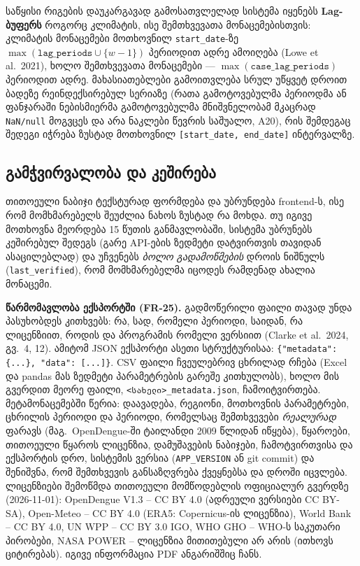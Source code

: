 \documentclass[11pt,a4paper]{article}
\begin{document}
საწყისი რიგების დაუკარგავად გამოსათვლელად სისტემა იყენებს \textbf{Lag-ბუფერს} როგორც კლიმატის, ისე შემთხვევათა მონაცემებისთვის:
კლიმატის მონაცემები მოთხოვნილ \texttt{start\_date}-ზე $\max(\texttt{lag\_periods} \cup \{w-1\})$ პერიოდით ადრე ამოიღება (Lowe et al.\ 2021),
ხოლო შემთხვევათა მონაცემები --- $\max(\texttt{case\_lag\_periods})$ პერიოდით ადრე.
მახასიათებლები გამოითვლება სრულ უწყვეტ დროით ბადეზე რეინდექსირებულ სერიაზე (რათა გამოტოვებულმა პერიოდმა ან ფანჯარაში ნებისმიერმა გამოტოვებულმა მნიშვნელობამ მკაცრად \texttt{NaN/null} მოგვცეს და არა ნაკლები წევრის საშუალო, A20),
რის შემდეგაც შედეგი იჭრება ზუსტად მოთხოვნილ \texttt{[start\_date, end\_date]} ინტერვალზე.

\subsection{გამჭვირვალობა და კეშირება}
თითოეული ნაბიჯი ტექსტურად ფორმდება და უბრუნდება frontend-ს, ისე რომ
მომხმარებელს შეუძლია ნახოს ზუსტად რა მოხდა. თუ იგივე მოთხოვნა მეორდება
15 წუთის განმავლობაში, სისტემა უბრუნებს კეშირებულ შედეგს (გარე API-ების
ზედმეტი დატვირთვის თავიდან ასაცილებლად) და უჩვენებს \emph{ბოლო
გადამოწმების} დროის ნიშნულს (\texttt{last\_verified}), რომ მომხმარებელმა
იცოდეს რამდენად ახალია მონაცემი.

\textbf{წარმომავლობა ექსპორტში (FR-25).} გადმოწერილი ფაილი თავად უნდა
პასუხობდეს კითხვებს: რა, სად, რომელი პერიოდი, საიდან, რა ლიცენზიით,
როდის და პროგრამის რომელი ვერსიით (Clarke et al.\ 2024, გვ.~4, 12).
ამიტომ JSON ექსპორტი ასეთი სტრუქტურისაა: \texttt{\{"metadata": \{...\}, "data": [...]\}}.
CSV ფაილი ჩვეულებრივ ცხრილად რჩება (Excel და pandas მას ზედმეტი
პარამეტრების გარეშე კითხულობს), ხოლო მის გვერდით მეორე ფაილი,
\texttt{<სახელი>\_metadata.json}, ჩამოიტვირთება. მეტამონაცემებში წერია: დაავადება,
რეგიონი, მოთხოვნის პარამეტრები, ცხრილის პერიოდი და პერიოდი, რომელსაც
შემთხვევები \emph{რეალურად} ფარავს (მაგ.\ OpenDengue-ში ტაილანდი 2009 წლიდან იწყება),
წყაროები, თითოეული წყაროს ლიცენზია, დამუშავების ნაბიჯები, ჩამოტვირთვისა
და ექსპორტის დრო, სისტემის ვერსია (\texttt{APP\_VERSION} ან git commit) და
შენიშვნა, რომ შემთხვევის განსაზღვრება ქვეყნებსა და დროში იცვლება.
ლიცენზიები შემოწმდა თითოეული მომწოდებლის ოფიციალურ გვერდზე (2026-11-01):
OpenDengue V1.3 -- CC BY 4.0 (ადრეული ვერსიები CC BY-SA), Open-Meteo -- CC BY 4.0
(ERA5: Copernicus-ის ლიცენზია), World Bank -- CC BY 4.0, UN WPP -- CC BY 3.0 IGO,
WHO GHO -- WHO-ს საკუთარი პირობები, NASA POWER -- ლიცენზია მითითებული არ არის
(ითხოვს ციტირებას). იგივე ინფორმაცია PDF ანგარიშშიც ჩანს.
\end{document}
